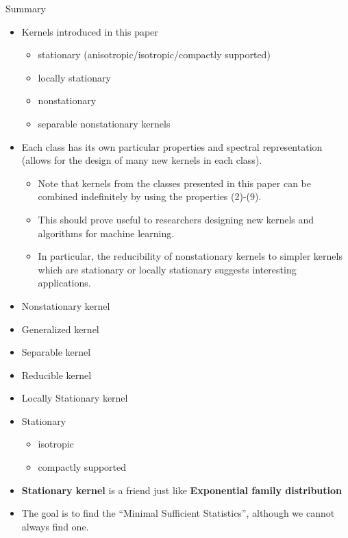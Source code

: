 \documentclass[
  ignorenonframetext,
]{beamer}
\providecommand{\tightlist}{%
  \setlength{\itemsep}{0pt}\setlength{\parskip}{0pt}}
\begin{document}
\begin{frame}{Summary}
\protect\hypertarget{summary}{}
\begin{itemize}
\tightlist
\item
  Kernels introduced in this paper

  \begin{itemize}
  \tightlist
  \item
    stationary (anisotropic/isotropic/compactly supported)
  \item
    locally stationary
  \item
    nonstationary
  \item
    separable nonstationary kernels
  \end{itemize}
\item
  Each class has its own particular properties and spectral
  representation (allows for the design of many new kernels in each
  class).

  \begin{itemize}
  \tightlist
  \item
    Note that kernels from the classes presented in this paper can be
    combined indefinitely by using the properties (2)-(9).
  \item
    This should prove useful to researchers designing new kernels and
    algorithms for machine learning.
  \item
    In particular, the reducibility of nonstationary kernels to simpler
    kernels which are stationary or locally stationary suggests
    interesting applications.
  \end{itemize}
\end{itemize}
\end{frame}

\begin{frame}{}
\protect\hypertarget{section-18}{}
\begin{itemize}
\item
  Nonstationary kernel\\
\item
  Generalized kernel
\item
  Separable kernel
\item
  Reducible kernel
\item
  Locally Stationary kernel
\item
  Stationary

  \begin{itemize}
  \tightlist
  \item
    isotropic
  \item
    compactly supported
  \end{itemize}
\item
  \textbf{Stationary kernel} is a friend just like \textbf{Exponential
  family distribution}
\item
  The goal is to find the ``Minimal Sufficient Statistics'', although we
  cannot always find one.
\end{itemize}
\end{frame}
\end{document}
